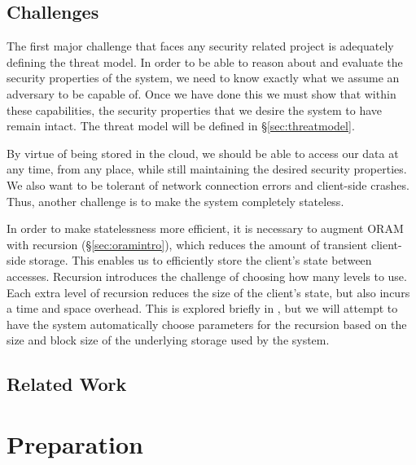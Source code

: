 \documentclass[12pt,a4paper,twoside,openright]{report}
\begin{document}
\section{Challenges}

The first major challenge that faces any security related project is adequately defining the threat model. In order to be able to reason about and evaluate the security properties of the system, we need to know exactly what we assume an adversary to be capable of. Once we have done this we must show that within these capabilities, the security properties that we desire the system to have remain intact. The threat model will be defined in \S\ref{sec:threatmodel}.

By virtue of being stored in the cloud, we should be able to access our data at any time, from any place, while still maintaining the desired security properties. We also want to be tolerant of network connection errors and client-side crashes. Thus, another challenge is to make the system completely stateless.

In order to make statelessness more efficient, it is necessary to augment ORAM with recursion (\S\ref{sec:oramintro}), which reduces the amount of transient client-side storage. This enables us to efficiently store the client's state between accesses. Recursion introduces the challenge of choosing how many levels to use. Each extra level of recursion reduces the size of the client's state, but also incurs a time and space overhead. This is explored briefly in \cite{stefanov2013path}, but we will attempt to have the system automatically choose parameters for the recursion based on the size and block size of the underlying storage used by the system.

\section{Related Work}

\chapter{Preparation}




\end{document}
